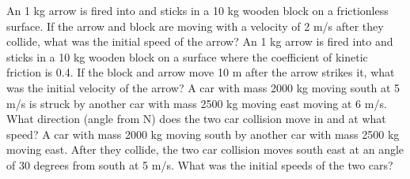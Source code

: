 \documentclass[12pt]{article}
\begin{document}
\pagestyle{empty}
\noindent An 1 kg arrow is fired into and sticks in a 10 kg wooden block on a frictionless surface.  If the arrow and block are moving with a velocity of 2 m/s after they collide, what was the initial speed of the arrow?
\newpage
\noindent An 1 kg arrow is fired into and sticks in a 10 kg wooden block on a surface where the coefficient of kinetic friction is 0.4.  If the block and arrow move 10 m after the arrow strikes it, what was the initial velocity of the arrow?
\newpage
\noindent A car with mass 2000 kg moving south at 5 m/s is struck by another car with mass 2500 kg moving east moving at 6 m/s.  What direction (angle from N) does the two car collision move in and at what speed?
\newpage
\noindent A car with mass 2000 kg moving south by another car with mass 2500 kg moving east.  After they collide, the two car collision moves south east at an angle of 30 degrees from south at 5 m/s.  What was the initial speeds of the two cars?
\end{document}
